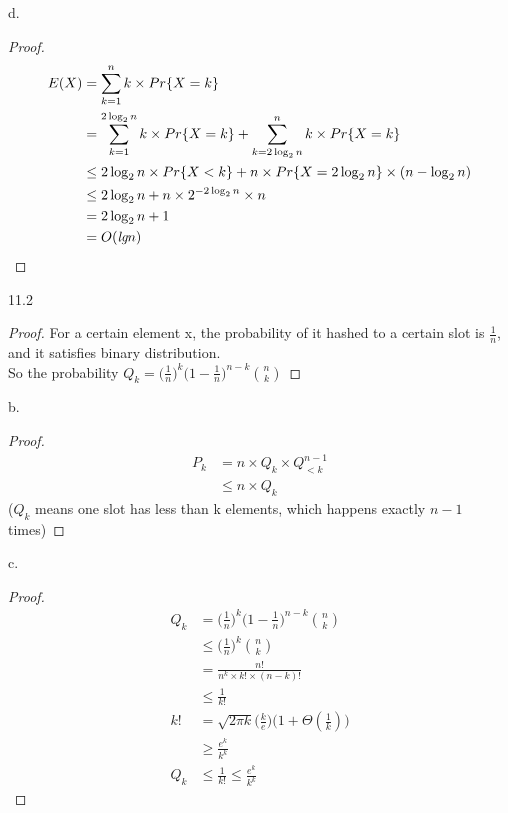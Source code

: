 \documentclass{article}
\begin{document}
d.\begin{proof}
\begin{equation*}
\begin{aligned}
E(X)&=\sum_{k=1}^{n}k\times Pr\{X=k\}\\
&=\sum_{k=1}^{2\log_2{n}}k\times Pr\{X=k\}+\sum_{k=2\log_2{n}}^{n}{k\times Pr\{X=k\}}\\
&\leq 2\log_2{n}\times Pr\{X<k\}+n\times Pr\{X=2\log_2{n}\}\times (n-\log_2{n})\\
&\leq 2\log_2{n}+n\times 2^{-2\log_2{n}}\times n\\
&=2\log_2{n}+1\\
&=O(\emph{lg}n)
\end{aligned}
\end{equation*}
\end{proof}
11.2
\begin{proof}
For a certain element x, the probability of it hashed to a certain slot is $\frac{1}{n}$, and it satisfies binary distribution.\\So the probability $Q_k=\big(\frac{1}{n}\big)^k\big(1-\frac{1}{n}\big)^{n-k}\binom{n}{k}$
\end{proof}
b.\begin{proof}
\begin{equation*}
\begin{aligned}
P_k&=n\times Q_k\times Q_{<k}^{n-1}\\
&\leq n\times Q_k
\end{aligned}
\end{equation*}
\setlength\parindent{4em}($Q_k$ means one slot has less than k elements, which happens exactly $n-1$ times)
\end{proof}
c.\begin{proof}
\begin{equation*}
\begin{aligned}
Q_k&=\big(\frac{1}{n}\big)^k\big(1-\frac{1}{n}\big)^{n-k}\binom{n}{k}\\
&\leq \big(\frac{1}{n}\big)^k\binom{n}{k}\\
&=\frac{n!}{n^k\times k!\times(n-k)!}\\
&\leq\frac{1}{k!}\\
k!&=\sqrt{2\pi k}\big(\frac{k}{e}\big)\big(1+\Theta(\frac{1}{k})\big)\\
&\geq \frac{e^k}{k^k}\\
Q_k&\leq\frac{1}{k!}\leq{\frac{e^k}{k^k}}
\end{aligned}
\end{equation*}
\end{proof}
\end{document}
